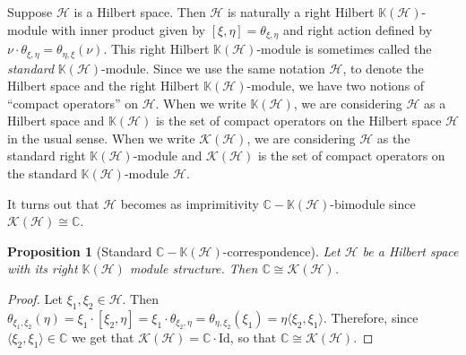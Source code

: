 \documentclass[11pt, letterpaper,final]{amsart}
\renewcommand{\H}{{\mathcal{H}}}
\newcommand{\K}{{\mathcal{K}}}
\newcommand{\bbK}{{\mathbb{K}}}
\newtheorem{prp}[thm]{Proposition}
\theoremstyle{definition}
\begin{document}
Suppose $\H$ is a Hilbert space. Then $\H$ is naturally a right Hilbert $\bbK(\H)$-module with inner product given by $[ \xi,\eta ] = \theta_{\xi,\eta}$ and right action defined by $\nu \cdot \theta_{\xi , \eta} = \theta_{\eta, \xi} (\nu)$.  This right Hilbert $\bbK(\H)$-module is sometimes called the \emph{standard} $\bbK(\H)$-module.  Since we use the same notation $\H$, to denote the Hilbert space and the right Hilbert $\bbK(\H)$-module, we have two notions of ``compact operators'' on $\H$.  When we write $\bbK(\H)$, we are considering $\H$ as a Hilbert space and $\bbK(\H)$ is the set of compact operators on the Hilbert space $\H$ in the usual sense.  When we write $\K(\H)$, we are considering $\H$ as the standard right $\bbK(\H)$-module and $\K(\H)$ is the set of compact operators on the standard $\bbK(\H)$-module $\H$.

It turns out that $\H$ becomes as imprimitivity $\mathbb{C}-\bbK(\H)$-bimodule since $\K(\H) \cong \mathbb{C}$.

\begin{prp}[Standard $\mathbb{C}-\bbK(\H)$-correspondence] \label{prp-hilbertspace-corr}
Let $\H$ be a Hilbert space with its right $\mathbb{K}(\H)$ module structure. Then $\mathbb{C} \cong \K(\H)$.
\end{prp}

\begin{proof}
Let $\xi_1, \xi_2 \in \H$.  Then $\theta_{\xi_1, \xi_2}(\eta) = \xi_1 \cdot [ \xi_2, \eta ] = \xi_1 \cdot \theta_{\xi_2, \eta} = \theta_{\eta, \xi_2} (\xi_1) = \eta \langle \xi_2, \xi_1 \rangle$.  Therefore, since $\langle \xi_2, \xi_1 \rangle \in \mathbb{C}$ we get that $\K(\H) = \mathbb{C} \cdot \mathrm{Id}$, so that $\mathbb{C} \cong \mathcal{K}(\H)$.
\end{proof}
\end{document}
